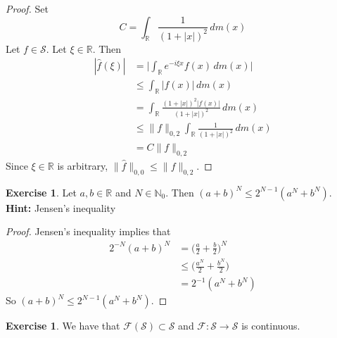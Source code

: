 \documentclass[12pt]{amsart}
\theoremstyle{definition}
\newtheorem{ex}[definition]{Exercise}
\newcommand{\N}{\mathbb{N}}
\newcommand{\R}{\mathbb{R}}
\newcommand{\MF}{\mathcal{F}}
\newcommand{\MS}{\mathcal{S}}
\newcommand{\dm}{\, d m}
\begin{document}
	\begin{proof}
		Set 
		$$C = \int_{\R} \frac{1}{(1+|x|)^2} \dm(x)$$
		Let $f \in \MS$. Let $\xi \in \R$. Then 
		\begin{align*}
			|\hat{f}(\xi)| 
			& = \bigg| \int_{\R} e^{-i\xi x} f(x) \dm(x) \bigg| \\
			& \leq  \int_{\R} | f(x)| \dm(x) \\
			& =  \int_{\R} \frac{(1+|x|)^2|f(x)|}{(1+|x|)^2} \dm(x) \\
			& \leq \|f\|_{0, 2} \int_{\R} \frac{1}{(1+|x|)^2} \dm(x) \\
			& = C\|f\|_{0, 2}
		\end{align*}
		Since $\xi \in \R$ is arbitrary, $\|\hat{f}\|_{0,0} \leq \|f\|_{0, 2}$.
	\end{proof}

	\begin{ex}
		Let $a, b \in \R$ and $N \in \N_0$. Then $(a + b)^N \leq 2^{N-1} (a^N + b^N)$. \\
		\textbf{Hint:} Jensen's inequality
	\end{ex}
	
	\begin{proof}
		Jensen's inequality implies that 
		\begin{align*}
			2^{-N}(a + b)^N 
			& = \bigg(\frac{a}{2} + \frac{b}{2} \bigg)^N \\
			& \leq \bigg(\frac{a^N}{2} + \frac{b^N}{2} \bigg) \\
			& = 2^{-1}(a^N + b^N)
		\end{align*}
	So $(a + b)^N \leq 2^{N-1} (a^N + b^N)$.
	\end{proof}

	\begin{ex}
		We have that $ \MF(\MS) \subset \MS$ and $\MF: \MS \rightarrow \MS$ is continuous. 
	\end{ex}
\end{document}
